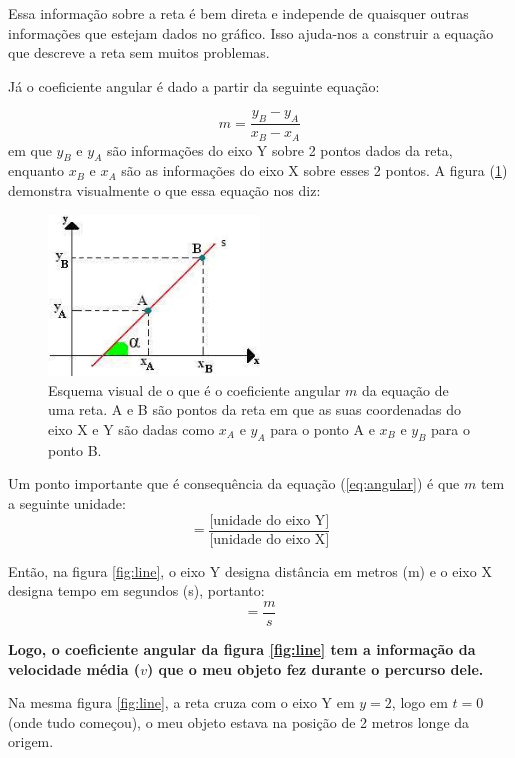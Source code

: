 \documentclass[12pt]{extarticle}
\newcommand{\<}{\langle}
\renewcommand{\>}{\rangle}
\theoremstyle{definition}
\begin{document}
Essa informação sobre a reta é bem direta e independe de quaisquer outras informações que estejam dados no gráfico. Isso ajuda-nos a construir a equação que descreve a reta sem muitos problemas.

Já o coeficiente angular é dado a partir da seguinte equação:

\begin{equation}\label{eq:angular}
    m = \frac{y_B - y_A}{x_B - x_A}
\end{equation}
em que $y_B$ e $y_A$ são informações do eixo Y sobre 2 pontos dados da reta, enquanto $x_B$ e $x_A$ são as informações do eixo X sobre esses 2 pontos. A figura (\ref{fig:coef_ang}) demonstra visualmente o que essa equação nos diz:
\begin{figure}[H]
    \centering
    \includegraphics[width=0.5\textwidth]{cauculo coefi1.jpg}
    \caption{Esquema visual de o que é o coeficiente angular $m$ da equação de uma reta. A e B são pontos da reta em que as suas coordenadas do eixo X e Y são dadas como $x_A$ e $y_A$ para o ponto A e $x_B$ e $y_B$ para o ponto B.}
    \label{fig:coef_ang}
\end{figure}

Um ponto importante que é consequência da equação (\ref{eq:angular}) é que $m$ tem a seguinte unidade:
\begin{equation}
    [m] = \frac{\text{[unidade do eixo Y]}}{\text{[unidade do eixo X]}}
\end{equation}

Então, na figura \ref{fig:line}, o eixo Y designa distância em metros (m) e o eixo X designa tempo em segundos (s), portanto:
\begin{equation}
    [m] = \frac{m}{s}
\end{equation}

\textbf{Logo, o coeficiente angular da figura \ref{fig:line} tem a informação da velocidade média ($v$) que o meu objeto fez durante o percurso dele.}

Na mesma figura \ref{fig:line}, a reta cruza com o eixo Y em $y=2$, logo em $t=0$ (onde tudo começou), o meu objeto estava na posição de 2 metros longe da origem.
\end{document}
